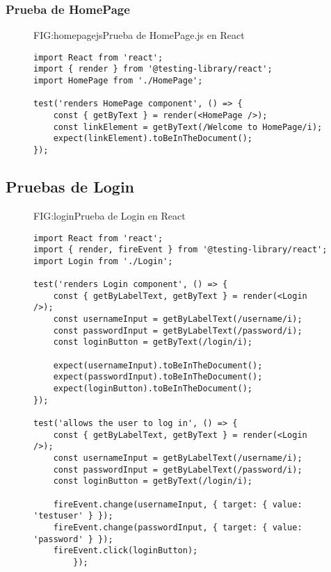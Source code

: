 \subsubsection{Prueba de HomePage}
\begin{figure}[Prueba de HomePage.js]{FIG:homepagejs}{Prueba de HomePage.js en React}
    \begin{verbatim}
import React from 'react';
import { render } from '@testing-library/react';
import HomePage from './HomePage';

test('renders HomePage component', () => {
    const { getByText } = render(<HomePage />);
    const linkElement = getByText(/Welcome to HomePage/i);
    expect(linkElement).toBeInTheDocument();
});
    \end{verbatim}
    \end{figure}

\newpage

\subsection{Pruebas de Login}

\begin{figure}[Prueba de Login]{FIG:login}{Prueba de Login en React}
    \begin{verbatim}
import React from 'react';
import { render, fireEvent } from '@testing-library/react';
import Login from './Login';

test('renders Login component', () => {
    const { getByLabelText, getByText } = render(<Login />);
    const usernameInput = getByLabelText(/username/i);
    const passwordInput = getByLabelText(/password/i);
    const loginButton = getByText(/login/i);

    expect(usernameInput).toBeInTheDocument();
    expect(passwordInput).toBeInTheDocument();
    expect(loginButton).toBeInTheDocument();
});

test('allows the user to log in', () => {
    const { getByLabelText, getByText } = render(<Login />);
    const usernameInput = getByLabelText(/username/i);
    const passwordInput = getByLabelText(/password/i);
    const loginButton = getByText(/login/i);

    fireEvent.change(usernameInput, { target: { value: 'testuser' } });
    fireEvent.change(passwordInput, { target: { value: 'password' } });
    fireEvent.click(loginButton);
        });
    \end{verbatim}
    \end{figure}

